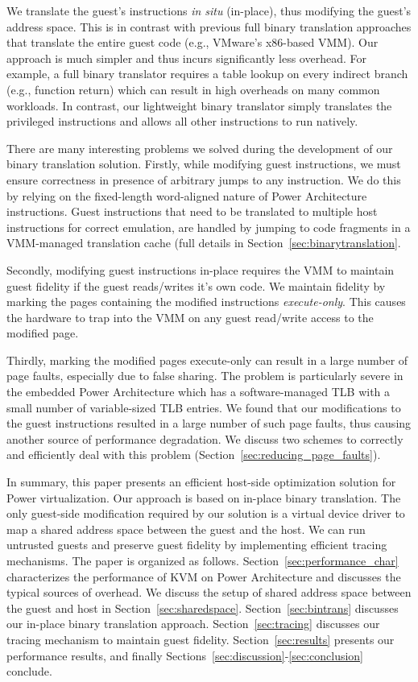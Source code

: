 \documentclass[10pt,twocolumn]{article}
\begin{document}
We translate the guest's instructions {\em in situ} (in-place), thus modifying the guest's
address space. This is in contrast with previous full binary translation approaches
that translate the entire guest
code (e.g., VMware's x86-based VMM\cite{agesen:comparison}). Our approach is much
simpler and thus incurs significantly less overhead. For example, a full binary
translator requires a table lookup on every indirect branch (e.g., function return) which
can result in high overheads on many common workloads. In contrast, our lightweight
binary translator simply translates the privileged instructions and allows all other
instructions to run natively.

There are many interesting problems we solved during the development of our
binary translation solution. 
Firstly, while modifying guest instructions, we must ensure correctness in presence
of arbitrary jumps to any instruction. We do this by relying on the fixed-length
word-aligned nature of Power Architecture instructions. Guest instructions
that need to be translated to multiple host instructions for correct emulation, are
handled by jumping to code fragments in a VMM-managed translation cache (full
details in Section~\ref{sec:binarytranslation}.

Secondly, modifying guest instructions in-place requires the VMM to maintain guest
fidelity if the guest reads/writes it's own code. We maintain fidelity by 
marking the pages containing the modified instructions {\em execute-only}. This
causes the hardware to trap into the VMM on any guest read/write access to the
modified page.

Thirdly, marking the modified pages execute-only can result in a large number of
page faults, especially due to false sharing. The problem is particularly
severe in the embedded Power Architecture which has a software-managed TLB with
a small number of variable-sized TLB entries. We found that our modifications to
the guest instructions resulted in a large number of such page faults, thus causing
another source of performance degradation. We discuss two schemes to correctly
and efficiently deal with this problem (Section~\ref{sec:reducing_page_faults}).

In summary, this paper presents an efficient host-side optimization solution for
Power virtualization. Our approach is based on in-place binary translation.
The only guest-side modification required by our solution is a virtual
device driver to map a shared address space between the guest and the host.
We can run untrusted guests and preserve guest fidelity by implementing efficient
tracing mechanisms.
The paper is organized as
follows. Section~\ref{sec:performance_char} characterizes the performance of
KVM on Power Architecture and discusses the typical sources of overhead.
We discuss the setup of shared address space between the guest and host
in Section~\ref{sec:sharedspace}.
Section~\ref{sec:bintrans} discusses our in-place binary translation approach.
Section~\ref{sec:tracing} discusses our tracing mechanism to maintain guest fidelity.
Section~\ref{sec:results} presents our performance results, and
finally Sections~\ref{sec:discussion}-\ref{sec:conclusion} conclude.
\end{document}
